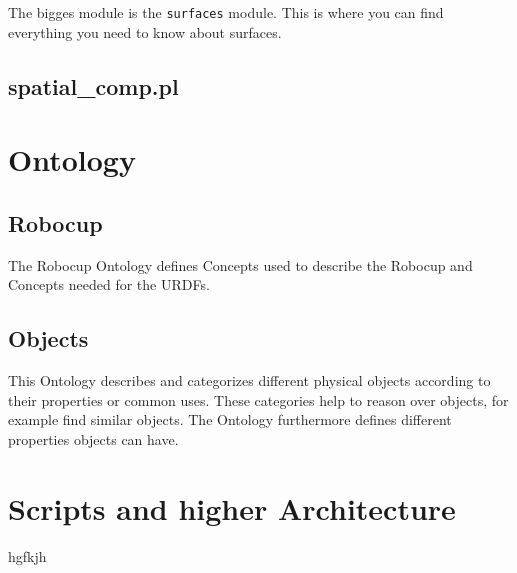 \documentclass[main.tex]{subfiles}
\begin{document}
The bigges module is the \texttt{surfaces} module. This is where you can find everything you need to know about surfaces.

\subsection{spatial\_comp.pl}



\section{Ontology}
\subsection{Robocup}
	  	
	  	The Robocup Ontology defines Concepts used to describe the Robocup and Concepts needed for the URDFs.
	  	
	  	\subsection{Objects}
	  	
	  	This Ontology describes and categorizes different physical objects according to their properties or common uses. These categories help to reason over objects, for example find similar objects. The Ontology furthermore defines different properties objects can have.  
	  	

\section{Scripts and higher Architecture}
hgfkjh

	\endgroup
\end{document}
